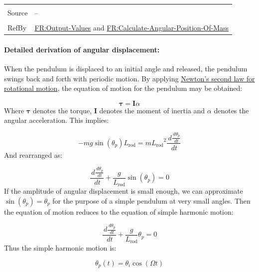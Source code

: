 \documentclass[12pt]{article}
\begin{document}
\begin{minipage}{\textwidth}
\begin{tabular}{>{\raggedright}p{}>{\raggedright\arraybackslash}p{}}
\\ \midrule \\
Source & --
         
\\ \midrule \\
RefBy & \hyperref[outputValues]{FR:Output-Values} and \hyperref[calcAngPos]{FR:Calculate-Angular-Position-Of-Mass}
        
\\ \bottomrule
\end{tabular}
\end{minipage}
\paragraph{Detailed derivation of angular displacement:}
\label{IM:calOfAngularDisplacementDeriv}
When the pendulum is displaced to an initial angle and released, the pendulum swings back and forth with periodic motion. By applying \hyperref[TM:NewtonSecLawRotMot]{Newton's second law for rotational motion}, the equation of motion for the pendulum may be obtained:

\begin{displaymath}
\symbf{τ}=\symbf{I} α
\end{displaymath}
Where $\symbf{τ}$ denotes the torque, $\symbf{I}$ denotes the moment of inertia and $α$ denotes the angular acceleration. This implies:

\begin{displaymath}
-m g \sin\left({θ_{p}}\right) {L_{\text{rod}}}=m {L_{\text{rod}}}^{2} \frac{\,d\frac{\,d{θ_{p}}}{\,dt}}{\,dt}
\end{displaymath}
And rearranged as:

\begin{displaymath}
\frac{\,d\frac{\,d{θ_{p}}}{\,dt}}{\,dt}+\frac{g}{{L_{\text{rod}}}} \sin\left({θ_{p}}\right)=0
\end{displaymath}
If the amplitude of angular displacement is small enough, we can approximate $\sin\left({θ_{p}}\right)={θ_{p}}$ for the purpose of a simple pendulum at very small angles. Then the equation of motion reduces to the equation of simple harmonic motion:

\begin{displaymath}
\frac{\,d\frac{\,d{θ_{p}}}{\,dt}}{\,dt}+\frac{g}{{L_{\text{rod}}}} {θ_{p}}=0
\end{displaymath}
Thus the simple harmonic motion is:

\begin{displaymath}
{θ_{p}}\left(t\right)={θ_{i}} \cos\left(Ω t\right)
\end{displaymath}
\end{document}
